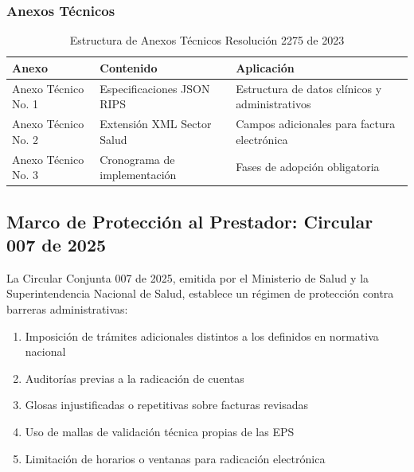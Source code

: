 \documentclass[12pt,letterpaper]{report}
\begin{document}
\subsubsection{Anexos Técnicos}

\begin{table}[H]
\centering
\caption{Estructura de Anexos Técnicos Resolución 2275 de 2023}
\label{tab:anexos}
\begin{tabular}{@{}p{3cm}p{5cm}p{6cm}@{}}
\toprule
\textbf{Anexo} & \textbf{Contenido} & \textbf{Aplicación} \\
\midrule
Anexo Técnico No. 1 & Especificaciones JSON RIPS & Estructura de datos clínicos y administrativos \\
Anexo Técnico No. 2 & Extensión XML Sector Salud & Campos adicionales para factura electrónica \\
Anexo Técnico No. 3 & Cronograma de implementación & Fases de adopción obligatoria \\
\bottomrule
\end{tabular}
\end{table}

\subsection{Marco de Protección al Prestador: Circular 007 de 2025}

La Circular Conjunta 007 de 2025, emitida por el Ministerio de Salud y la Superintendencia Nacional de Salud, establece un régimen de protección contra barreras administrativas:

\begin{definicion}
\begin{enumerate}
    \item Imposición de trámites adicionales distintos a los definidos en normativa nacional
    \item Auditorías previas a la radicación de cuentas
    \item Glosas injustificadas o repetitivas sobre facturas revisadas
    \item Uso de mallas de validación técnica propias de las EPS
    \item Limitación de horarios o ventanas para radicación electrónica
\end{enumerate}
\end{definicion}

\end{document}
